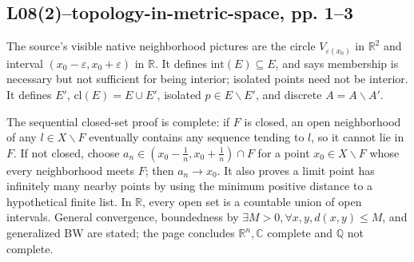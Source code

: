 \subsection{L08(2)--topology-in-metric-space, pp. 1--3}

The source's visible native neighborhood pictures are the circle \(V_{\varepsilon{(x_{0})}}\) in \(\mathbb{R}^{2}\) and interval \(\left( {x_{0} - \varepsilon,x_{0} + \varepsilon} \right)\) in \(\mathbb{R}\). It defines \(\text{int}(E) \subseteq E\), and says membership is necessary but not sufficient for being interior; isolated points need not be interior. It defines \(E'\), \(\text{cl}(E) = E \cup E'\), isolated \(p \in E \smallsetminus E'\), and discrete \(A = A \smallsetminus A'\).

The sequential closed-set proof is complete: if \(F\) is closed, an open neighborhood of any \(l \in X \smallsetminus F\) eventually contains any sequence tending to \(l\), so it cannot lie in \(F\). If not closed, choose \(a_{n} \in \left( {x_{0} - \frac{1}{n},x_{0} + \frac{1}{n}} \right) \cap F\) for a point \(x_{0} \in X \smallsetminus F\) whose every neighborhood meets \(F\); then \(a_{n}\rightarrow x_{0}\). It also proves a limit point has infinitely many nearby points by using the minimum positive distance to a hypothetical finite list. In \(\mathbb{R}\), every open set is a countable union of open intervals. General convergence, boundedness by \(\exists M > 0,\forall x,y,d\left( {x,y} \right) \leq M\), and generalized BW are stated; the page concludes \(\mathbb{R}^{n},\mathbb{C}\) complete and \(\mathbb{Q}\) not complete.
